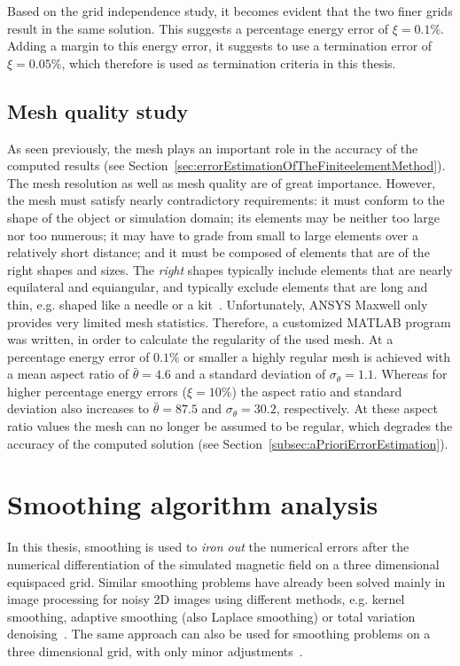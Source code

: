 Based on the grid independence study, it becomes evident that the two finer grids result in the same solution. This suggests a percentage energy error of $\xi=0.1\%$. Adding a margin to this energy error, it suggests to use a termination error of $\xi=0.05\%$, which therefore is used as termination criteria in this thesis.

\section{Mesh quality study}
\label{sec:meshQualityStudy}
As seen previously, the mesh plays an important role in the accuracy of the computed results (see Section~\ref{sec:errorEstimationOfTheFiniteelementMethod}). The mesh resolution as well as mesh quality are of great importance. However, the mesh must satisfy nearly contradictory requirements: it must conform to the shape of the object or simulation domain; its elements may be neither too large nor too numerous; it may have to grade from small to large elements over a relatively short distance; and it must be composed of elements that are of the right shapes and sizes. The \textit{right} shapes typically include elements that are nearly equilateral and equiangular, and typically exclude elements that are long and thin, e.g. shaped like a needle or a kit~\cite{Cheng2012}. Unfortunately, ANSYS Maxwell only provides very limited mesh statistics. Therefore, a customized MATLAB program was written, in order to calculate the regularity of the used mesh. At a percentage energy error of $0.1\%$ or smaller a highly regular mesh is achieved with a mean aspect ratio of $\bar{\theta}=4.6$ and a standard deviation of $\sigma_{\theta}=1.1$. Whereas for higher percentage energy errors ($\xi=10\%$) the aspect ratio and standard deviation also increases to $\bar{\theta}=87.5$ and $\sigma_{\theta}=30.2$, respectively. At these aspect ratio values the mesh can no longer be assumed to be regular, which degrades the accuracy of the computed solution (see Section~\ref{subsec:aPrioriErrorEstimation}).

\cleardoublepage

\chapter{Smoothing algorithm analysis}\label{sec:smoothingAlgorithmAnalysis}
In this thesis, smoothing is used to \textit{iron out} the numerical errors after the numerical differentiation of the simulated magnetic field on a three dimensional equispaced grid. Similar smoothing problems have already been solved mainly in image processing for noisy 2D images using different methods, e.g. kernel smoothing, adaptive smoothing (also Laplace smoothing) or total variation denoising~\cite{Jain1989,Buades2005}. The same approach can also be used for smoothing problems on a three dimensional grid, with only minor adjustments~\cite{Eubank1999,Takezawa2005}.

